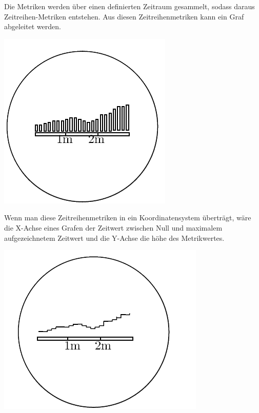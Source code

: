 \documentclass[a4paper,10pt]{scrartcl}
\begin{document}
Die Metriken werden über einen definierten Zeitraum gesammelt, sodass daraus Zeitreihen-Metriken entstehen. Aus diesen Zeitreihenmetriken kann ein Graf abgeleitet werden.\\
\begin{minipage}{\linewidth}
  \includegraphics[scale=.3]{img/Datenaggregation/GrafAggregationNew.png}
\end{minipage} 

Wenn man diese Zeitreihenmetriken in ein Koordinatensystem überträgt, wäre die X-Achse eines Grafen der Zeitwert zwischen Null und maximalem aufgezeichnetem Zeitwert und die Y-Achse die höhe des Metrikwertes. \\
\begin{minipage}{\linewidth}
  \includegraphics[scale=.3]{img/Datenaggregation/GrafZeitNew.png} 
\end{minipage} 
\end{document}
